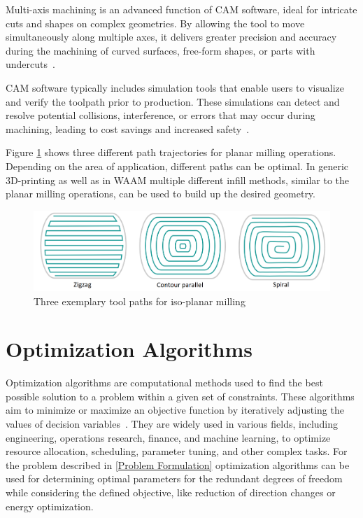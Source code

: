 Multi-axis machining is an advanced function of CAM software, ideal for intricate cuts and shapes on complex geometries. By allowing the tool to move simultaneously along multiple axes, it delivers greater precision and accuracy during the machining of curved surfaces, free-form shapes, or parts with undercuts~\cite{Takeuchi.2014}.

CAM software typically includes simulation tools that enable users to visualize and verify the toolpath prior to production. These simulations can detect and resolve potential collisions, interference, or errors that may occur during machining, leading to cost savings and increased safety~\cite{Dubovska.2014}. 

Figure \ref{3path} shows three different path trajectories for planar milling operations. Depending on the area of application, different paths can be optimal. In generic 3D-printing as well as in WAAM multiple different infill methods, similar to the planar milling operations, can be used to build up the desired geometry.  

\begin{figure}[H]
	\centerline{\includegraphics[scale=.35]{figures/path.png}}
	\caption{Three exemplary tool paths for iso-planar milling~\cite{Zhao.2018}}
	\label{3path}
\end{figure}

\section{Optimization Algorithms}%

Optimization algorithms are computational methods used to find the best possible solution to a problem within a given set of constraints. These algorithms aim to minimize or maximize an objective function by iteratively adjusting the values of decision variables~\cite{Sivanandam.2007b}. They are widely used in various fields, including engineering, operations research, finance, and machine learning, to optimize resource allocation, scheduling, parameter tuning, and other complex tasks. For the problem described in \ref{Problem Formulation} optimization algorithms can be used for determining optimal parameters for the redundant degrees of freedom while considering the defined objective, like reduction of direction changes or energy optimization. 


